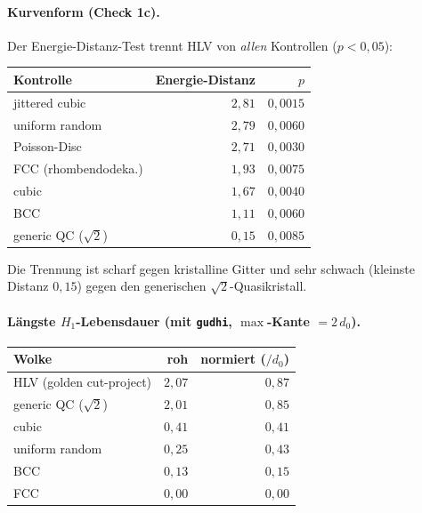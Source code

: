 \paragraph{Kurvenform (Check 1c).} Der Energie-Distanz-Test trennt HLV von
\emph{allen} Kontrollen ($p<0{,}05$):

\begin{center}
\begin{tabular}{lrr}
\hline
Kontrolle & Energie-Distanz & $p$ \\
\hline
jittered cubic        & $2{,}81$ & $0{,}0015$ \\
uniform random        & $2{,}79$ & $0{,}0060$ \\
Poisson-Disc          & $2{,}71$ & $0{,}0030$ \\
FCC (rhombendodeka.)  & $1{,}93$ & $0{,}0075$ \\
cubic                 & $1{,}67$ & $0{,}0040$ \\
BCC                   & $1{,}11$ & $0{,}0060$ \\
generic QC ($\sqrt2$) & $0{,}15$ & $0{,}0085$ \\
\hline
\end{tabular}
\end{center}

\noindent Die Trennung ist scharf gegen kristalline Gitter und sehr schwach
(kleinste Distanz $0{,}15$) gegen den generischen $\sqrt{2}$-Quasikristall.

\paragraph{Längste $H_1$-Lebensdauer (mit \texttt{gudhi}, $\max$-Kante
$=2\,d_0$).}

\begin{center}
\begin{tabular}{lrr}
\hline
Wolke & roh & normiert ($/d_0$) \\
\hline
HLV (golden cut-project)    & $2{,}07$ & $0{,}87$ \\
generic QC ($\sqrt2$)       & $2{,}01$ & $0{,}85$ \\
cubic                       & $0{,}41$ & $0{,}41$ \\
uniform random              & $0{,}25$ & $0{,}43$ \\
BCC                         & $0{,}13$ & $0{,}15$ \\
FCC                         & $0{,}00$ & $0{,}00$ \\
\hline
\end{tabular}
\end{center}

